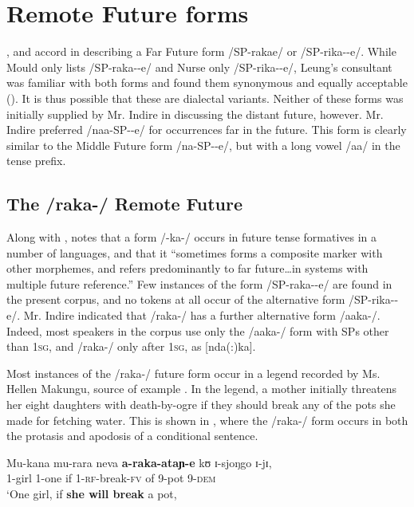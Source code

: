 \documentclass[output=paper]{langsci/langscibook}
\begin{document}
\section[Remote Future forms]{Remote Future forms} \label{sec:sarvasy:6}
\citet{Mould1981}, \citet{Leung1991} and \citet{Nurse2003aspect} accord in describing a Far Future %
%
form /SP-raka{\longrule}e/ or /SP-rika-{\longrule}-e/. While Mould only lists /SP-raka-{\longrule}-e/ and Nurse only /SP-rika-{\longrule}-e/, Leung’s consultant was familiar with both forms and found them synonymous and equally acceptable (\citeyear[204, fn 10]{Leung1991}). It is thus possible that these are dialectal variants. Neither of these forms was initially supplied by Mr. Indire in discussing the distant future, however. Mr. Indire preferred /naa-SP-{\longrule}-e/ for occurrences far in the future. This form is clearly similar to the Middle Future form /na-SP-{\longrule}-e/, but with a long vowel /aa/ in the tense prefix. 

\subsection{The /raka-/ Remote Future}\label{sec:sarvasy:6.1}

Along with \citet{Botne1999}, \citet[85]{Nurse2008} notes that a form /-ka-/ occurs in future tense formatives in a number of  languages, and that it “sometimes forms a composite marker with other morphemes, and refers predominantly to far future\ldots in systems with multiple future reference.” Few instances of the form /SP-raka-{\longrule}-e/ are found in the present corpus, and no tokens at all occur of the alternative form /SP-rika-{\longrule}-e/. Mr. Indire indicated that /raka-/ has a further alternative form /aaka-/. Indeed, most speakers in the corpus use only the \mbox{/aaka-/} form with SPs other than \textsc{1sg}, and /raka-/ only after \textsc{1sg}, as [nda(:)ka].

Most instances of the /raka-/ future form occur in a legend recorded by Ms. Hellen Makungu, source of example . In the legend, a mother initially threatens her eight daughters with death-by-ogre if they should break any of the pots she made for fetching water. This is shown in , where the /raka-/ form occurs in both the protasis and apodosis of a conditional sentence. 

\ea\label{ex:sarvasy:14}
\gll Mu-kana   mu-rara   neva   \textbf{a-raka-ataɲ-e}   kʊ     ɪ-sjoŋgo   ɪ-jɪ,  \\
1-girl    1-one    if  1-\textsc{rf}-break-\textsc{fv}  of  9-pot   9-\textsc{dem} \\
\glt ‘One girl, if \textbf{she will break} a pot,
\end{document}
